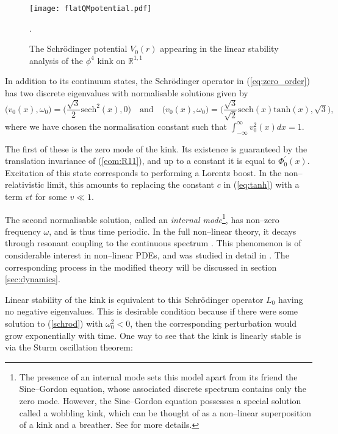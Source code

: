 \begin{figure}
\texttt{[image: flatQMpotential.pdf]}
\caption{\label{fig:flatQMpotential}The Schr\"odinger potential $V_0(r)$ appearing in the linear stability analysis of the $\phi^4$ kink on $\mathbb{R}^{1,1}$}.
\end{figure}

In addition to its continuum states, the Schr\"odinger operator in (\ref{eq:zero_order}) has two discrete eigenvalues with normalisable solutions given by
\begin{equation}
\label{eq:flat_vib_modes}
\big(v_0(x),\omega_0\big) = \bigg(\frac{\sqrt{3}}{2}\mathrm{sech}^2(x),0\bigg) \quad \mathrm{and} \quad
\big(v_0(x),\omega_0\big) = \bigg(\frac{\sqrt{3}}{\sqrt{2}}\mathrm{sech}(x)\mathrm{tanh}(x),\sqrt{3}\bigg),
\end{equation}
where we have chosen the normalisation constant such that $\int_{-\infty}^{\infty}v_0^2(x)dx=1$.

The first of these is the zero mode of the kink. Its existence is guaranteed by the translation invariance of (\ref{eom:R11}), and up to a constant it is equal to $\Phi_0^\prime(x)$. Excitation of this state corresponds to performing a Lorentz boost. In the non--relativistic limit, this amounts to replacing the constant $c$ in (\ref{eq:tanh}) with a term $vt$ for some $v\ll 1$.

The second normalisable solution, called an \textit{internal mode}\footnote{The presence of an internal mode sets this model apart from its friend the Sine--Gordon equation, whose associated discrete spectrum contains only the zero mode. However, the Sine--Gordon equation possesses a special solution called a wobbling kink, which can be thought of as a non--linear superposition of a kink and a breather. See \cite{Segur} for more details.}, has non--zero frequency $\omega$, and is thus time periodic. In the full non--linear theory, it decays through resonant coupling to the continuous spectrum \cite{Manton&Merabet}. This phenomenon is of considerable interest in non--linear PDEs, and was studied in detail in \cite{SW98}. The corresponding process in the modified theory will be discussed in section \ref{sec:dynamics}.

Linear stability of the kink is equivalent to this Schr\"odinger operator $L_0$ having no negative eigenvalues. This is desirable condition because if there were some solution to (\ref{schrod}) with $\omega_0^2<0$, then the corresponding perturbation would grow exponentially with time. One way to see that the kink is linearly stable is via the Sturm oscillation theorem:

